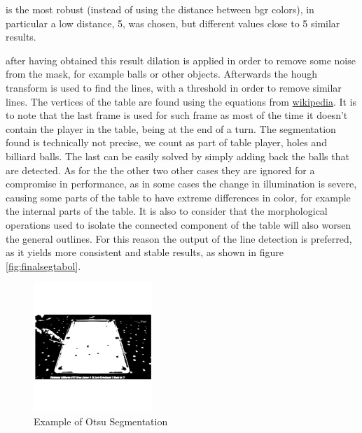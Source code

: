is the most robust (instead of using the distance between bgr colors), in particular a low distance, 5, was chosen, but different values close to 5 similar results.\par
after having obtained this result dilation is applied in order to remove some noise from the mask,
for example balls or other objects. Afterwards the hough transform is used to find the lines, 
with a threshold in order to remove similar lines.
The vertices of the table are found using the equations from \href{https://en.wikipedia.org/wiki/Line\%E2\%80\%93line\_intersection}{wikipedia}.
It is to note that the last frame is used for such frame as most of the time it doesn't contain the player in the table, being at the end of
a turn.
The segmentation found is technically not precise, we count as part of table player, holes and billiard balls. The last can be easily solved by simply adding back the balls that are detected. 
As for the the other two other cases they are ignored for a compromise in performance, as in some
cases the change in illumination is severe, causing some parts of the table to have extreme 
differences in color, for example the internal parts of the table. It is also to consider that the morphological operations used to isolate the connected component of the table will also worsen
the general outlines. For this reason the output of the line detection is preferred, as it yields
more consistent and stable results, as shown in figure \ref{fig:finalsegtabol}.

\begin{figure}[h!]
    \centering
    \includegraphics[width=0.4\textwidth]{./imgs/otsu_table.png}
    \caption{Example of Otsu Segmentation}
    \label{fig:otsutable}
\end{figure}

